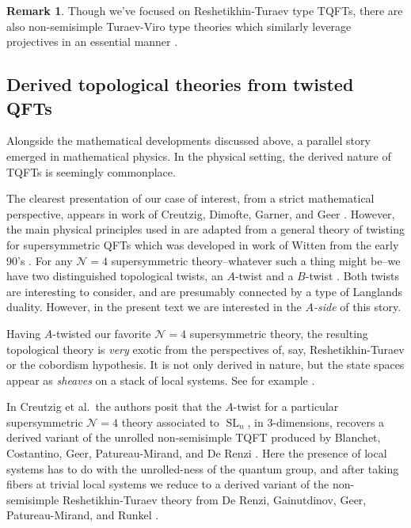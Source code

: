 \documentclass[reqno]{amsart}
\theoremstyle{definition}
\newtheorem{remark}[lemma]{Remark}
\newcommand{\mcl}[1]{\mathcal{#1}}
\newcommand{\opn}[1]{\operatorname{#1}}
\renewcommand{\1}{\mathbf{1}}
\begin{document}
\begin{remark}
Though we've focused on Reshetikhin-Turaev type TQFTs, there are also non-semisimple Turaev-Viro type theories which similarly leverage projectives in an essential manner \cite{derenzigeermirand18,costantinoetal}.
\end{remark}

\subsection{Derived topological theories from twisted QFTs}

Alongside the mathematical developments discussed above, a parallel story emerged in mathematical physics. In the physical setting, the derived nature of TQFTs is seemingly commonplace.
\par

The clearest presentation of our case of interest, from a strict mathematical perspective, appears in work of Creutzig, Dimofte, Garner, and Geer \cite{creutzigetal24}.  However, the main physical principles used in \cite{creutzigetal24} are adapted from a general theory of twisting for supersymmetric QFTs which was developed in work of Witten from the early 90's \cite{witten91}. For any $\mcl{N}=4$ supersymmetric theory--whatever such a thing might be--we have two distinguished topological twists, an $A$-twist and a $B$-twist \cite{kapustinwitten06,gaiotto19}.  Both twists are interesting to consider, and are presumably connected by a type of Langlands duality.  However, in the present text we are interested in the {\it $A$-side} of this story.

Having $A$-twisted our favorite $\mcl{N}=4$ supersymmetric theory, the resulting topological theory is \emph{very} exotic from the perspectives of, say, Reshetikhin-Turaev or the cobordism hypothesis. It is not only derived in nature, but the state spaces appear as \emph{sheaves} on a stack of local systems. See for example \cite{marcus95,gaiotto18,gaiotto19}.
\par

In Creutzig et al.\ the authors posit that the $A$-twist for a particular supersymmetric $\mcl{N}=4$ theory associated to $\opn{SL}_n$, in $3$-dimensions, recovers a derived variant of the unrolled non-semisimple TQFT produced by Blanchet, Costantino, Geer, Patureau-Mirand, and De Renzi \cite{blanchetetal16,derenzigeermirand20}.  Here the presence of local systems has to do with the unrolled-ness of the quantum group, and after taking fibers at trivial local systems we reduce to a derived variant of the non-semisimple Reshetikhin-Turaev theory from De Renzi, Gainutdinov, Geer, Patureau-Mirand, and Runkel \cite{derenzietal23}.
\par
\end{document}

